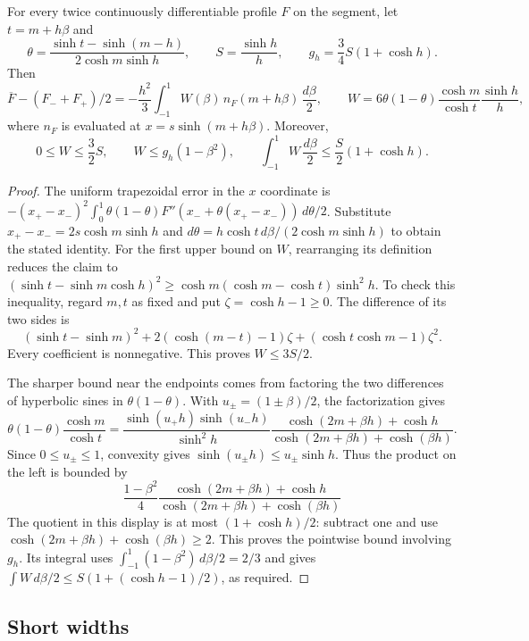 \begin{lemma}\label{lem:segment-chord}
For every twice continuously differentiable profile $F$ on the segment,
let $t=m+h\beta$ and
\[
 \theta=\frac{\sinh t-\sinh(m-h)}{2\cosh m\sinh h},\qquad
 S=\frac{\sinh h}{h},\qquad g_h=\frac34S(1+\cosh h).
\]
Then
\[
 \overline F-(F_-+F_+)/2 =-\frac{h^2}{3}\int_{-1}^1 W(\beta)\,n_F(m+h\beta)\,\frac{d\beta}2,\qquad
 W=6\theta(1-\theta)\frac{\cosh m}{\cosh t}\frac{\sinh h}{h},
\]
where $n_F$ is evaluated at $x=s\sinh(m+h\beta)$. Moreover,
\[
 0\le W\le\frac32S,\qquad
 W\le g_h(1-\beta^2),\qquad
 \int_{-1}^1W\,\frac{d\beta}{2}\le\frac S2(1+\cosh h).
\]
\end{lemma}
\begin{proof}
The uniform trapezoidal error in the $x$ coordinate is
$-(x_+-x_-)^2\int_0^1\theta(1-\theta)F''(x_-+\theta(x_+-x_-))\,d\theta/2$.
Substitute $x_+-x_-=2s\cosh m\sinh h$ and
$d\theta=h\cosh t\,d\beta/(2\cosh m\sinh h)$ to obtain the stated identity.
For the first upper bound on $W$, rearranging its definition reduces the
claim to
$(\sinh t-\sinh m\cosh h)^2\ge
\cosh m(\cosh m-\cosh t)\sinh^2h$.
To check this inequality, regard $m,t$ as fixed and put
$\zeta=\cosh h-1\ge0$. The difference of its two sides is
\[
 (\sinh t-\sinh m)^2
 +2(\cosh(m-t)-1)\zeta
 +(\cosh t\cosh m-1)\zeta^2.
\]
Every coefficient is nonnegative. This proves $W\le3S/2$.

The sharper bound near the endpoints comes from factoring the two
differences of hyperbolic sines in $\theta(1-\theta)$. With
$u_\pm=(1\pm\beta)/2$, the factorization gives
\[
 \theta(1-\theta)\frac{\cosh m}{\cosh t}
 =\frac{\sinh(u_+h)\sinh(u_-h)}{\sinh^2h}
  \frac{\cosh(2m+\beta h)+\cosh h}
       {\cosh(2m+\beta h)+\cosh(\beta h)}.
\]
Since $0\le u_\pm\le1$, convexity gives
$\sinh(u_\pm h)\le u_\pm\sinh h$. Thus the product on the left is bounded by
\[
 \frac{1-\beta^2}{4}\frac{\cosh(2m+\beta h)+\cosh h}{\cosh(2m+\beta h)+\cosh(\beta h)}
\]
The quotient in this display is at most $(1+\cosh h)/2$: subtract one
and use $\cosh(2m+\beta h)+\cosh(\beta h)\ge2$.
This proves the pointwise bound involving $g_h$. Its integral uses
$\int_{-1}^1(1-\beta^2)\,d\beta/2=2/3$ and gives
$\int W\,d\beta/2\le S(1+(\cosh h-1)/2)$, as required.
\end{proof}

\subsection{Short widths}\label{subsec:segments-short}

